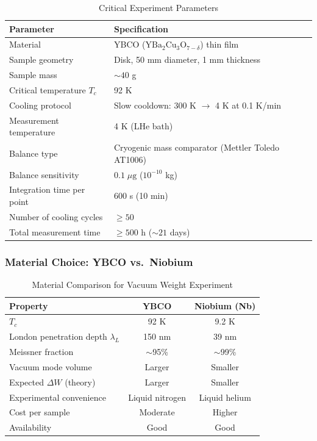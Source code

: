 \documentclass[11pt,a4paper]{article}
\begin{document}
\begin{table}[H]
\centering
\caption{Critical Experiment Parameters}
\begin{tabular}{p{4.5cm}p{6cm}}
\toprule
\textbf{Parameter} & \textbf{Specification} \\
\midrule
Material & YBCO ($\text{YBa}_2\text{Cu}_3\text{O}_{7-\delta}$) thin film \\
Sample geometry & Disk, 50 mm diameter, 1 mm thickness \\
Sample mass & $\sim 40$ g \\
Critical temperature $T_c$ & 92 K \\
Cooling protocol & Slow cooldown: 300 K $\to$ 4 K at 0.1 K/min \\
Measurement temperature & 4 K (LHe bath) \\
Balance type & Cryogenic mass comparator (Mettler Toledo AT1006) \\
Balance sensitivity & $0.1\;\mu\text{g}$ ($10^{-10}$ kg) \\
Integration time per point & 600 s (10 min) \\
Number of cooling cycles & $\geq 50$ \\
Total measurement time & $\geq 500$ h ($\sim 21$ days) \\
\bottomrule
\end{tabular}
\end{table}

\subsubsection{Material Choice: YBCO vs.\ Niobium}

\begin{table}[H]
\centering
\caption{Material Comparison for Vacuum Weight Experiment}
\begin{tabular}{lcc}
\toprule
\textbf{Property} & \textbf{YBCO} & \textbf{Niobium (Nb)} \\
\midrule
$T_c$ & 92 K & 9.2 K \\
London penetration depth $\lambda_L$ & 150 nm & 39 nm \\
Meissner fraction & $\sim$95\% & $\sim$99\% \\
Vacuum mode volume & Larger & Smaller \\
Expected $\Delta W$ (theory) & Larger & Smaller \\
Experimental convenience & Liquid nitrogen & Liquid helium \\
Cost per sample & Moderate & Higher \\
Availability & Good & Good \\
\bottomrule
\end{tabular}
\end{table}
\end{document}
